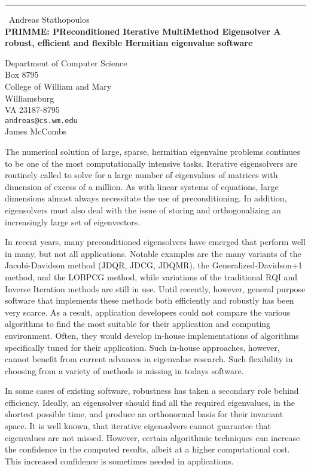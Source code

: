 \documentclass{report}
\begin{document}
\begin{center}
\rule{6in}{1pt} \
{\large Andreas Stathopoulos \\
{\bf PRIMME: PReconditioned Iterative MultiMethod Eigensolver A robust, efficient and flexible Hermitian eigenvalue software}}

Department of Computer Science \\ Box 8795 \\ College of William and Mary \\ Williamsburg \\ VA 23187-8795
\\
{\tt andreas@cs.wm.edu}\\
James McCombs\end{center}

The numerical solution of large, sparse, hermitian eigenvalue problems
continues to be one of the most computationally intensive tasks.
Iterative eigensolvers are routinely called to solve for a large number
of eigenvalues of matrices with dimension of excess of a million.
As with linear systems of equations, large dimensions almost always
necessitate the use of preconditioning. In addition, eigensolvers must
also deal with the issue of storing and orthogonalizing an increasingly
large set of eigenvectors.

In recent years, many preconditioned eigensolvers have emerged that
perform well in many, but not all applications. Notable examples are the
many variants of the Jacobi-Davidson method (JDQR, JDCG, JDQMR), the
Generalized-Davidson+1 method, and the LOBPCG method, while variations
of the traditional RQI and Inverse Iteration methods are still in use.
Until recently, however, general purpose software that implements these
methods both efficiently and robustly has been very scarce.
As a result, application developers
could not compare the various algorithms to find the most suitable for
their application and computing environment. Often, they would develop
in-house implementations of algorithms specifically tuned for their
application. Such in-house approaches, however, cannot benefit from
current advances in eigenvalue research. Such flexibility in choosing
from a variety of methods is missing in todays software.

In some cases of existing software, robustness has taken a secondary
role behind efficiency. Ideally, an eigensolver should find all the
required eigenvalues, in the shortest possible time, and produce an
orthonormal basis for their invariant space. It is well known, that
iterative eigensolvers cannot guarantee that eigenvalues are not missed.
However, certain algorithmic techniques can increase the confidence in
the computed results, albeit at a higher computational cost. This
increased confidence is sometimes needed in applications.
\end{document}
